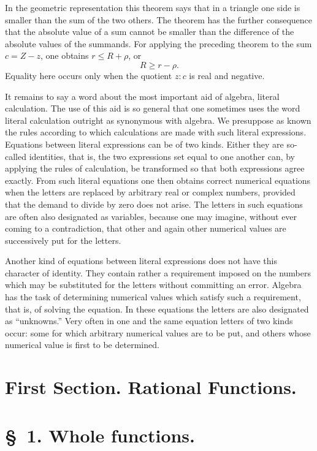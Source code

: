 \documentclass[11pt]{article}
\begin{document}
In the geometric representation this theorem says that in a triangle one side is smaller than the sum of the two others. The theorem has the further consequence that the absolute value of a sum cannot be smaller than the difference of the absolute values of the summands. For applying the preceding theorem to the sum $c=Z-z$, one obtains $r\le R+\rho$, or
\[
 R\ge r-\rho.
\]
Equality here occurs only when the quotient $z:c$ is real and negative.

It remains to say a word about the most important aid of algebra, literal calculation. The use of this aid is so general that one sometimes uses the word literal calculation outright as synonymous with algebra. We presuppose as known the rules according to which calculations are made with such literal expressions. Equations between literal expressions can be of two kinds. Either they are so-called identities, that is, the two expressions set equal to one another can, by applying the rules of calculation, be transformed so that both expressions agree exactly. From such literal equations one then obtains correct numerical equations when the letters are replaced by arbitrary real or complex numbers, provided that the demand to divide by zero does not arise. The letters in such equations are often also designated as variables, because one may imagine, without ever coming to a contradiction, that other and again other numerical values are successively put for the letters.

Another kind of equations between literal expressions does not have this character of identity. They contain rather a requirement imposed on the numbers which may be substituted for the letters without committing an error. Algebra has the task of determining numerical values which satisfy such a requirement, that is, of solving the equation. In these equations the letters are also designated as ``unknowns.'' Very often in one and the same equation letters of two kinds occur: some for which arbitrary numerical values are to be put, and others whose numerical value is first to be determined.

\clearpage
\clearpage

\section*{First Section. Rational Functions.}

\section*{\S~1. Whole functions.}
\end{document}
